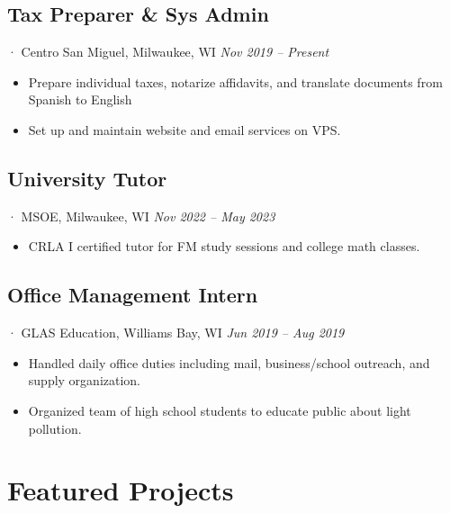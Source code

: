\documentclass[12pt]{article}
\newcommand{\itemspace}{\vspace{0.1870em}}
\begin{document}
\subsection{Tax Preparer \& Sys Admin}
· Centro San Miguel, Milwaukee, WI \hfill \textit{Nov 2019 -- Present}

\begin{itemize}[noitemsep,nolistsep]
  \item Prepare individual taxes, notarize affidavits, and translate documents
    from Spanish to English

  \item Set up and maintain website and email services on VPS.
\end{itemize}

\itemspace

\subsection{University Tutor}
· MSOE, Milwaukee, WI \hfill \textit{Nov 2022 -- May 2023}

\begin{itemize}[noitemsep,nolistsep]
  \item CRLA I certified tutor for FM study sessions and college math classes.
\end{itemize}

\itemspace

\subsection{Office Management Intern}
· GLAS Education, Williams Bay, WI  \hfill \textit{Jun 2019 -- Aug 2019}

\begin{itemize}[noitemsep,nolistsep]
  \item Handled daily office duties including mail, business/school outreach,
    and supply organization.

  \item Organized team of high school students to educate public about light
    pollution.
\end{itemize}

\itemspace

\section{Featured Projects}
\end{document}
